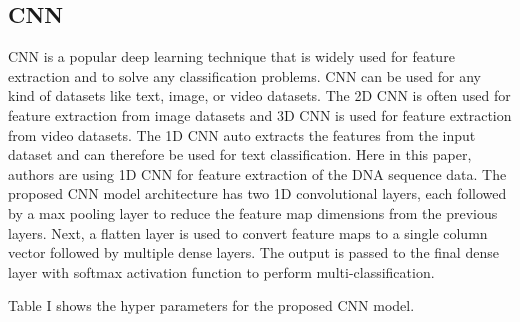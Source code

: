 \documentclass[journal]{IEEEtran}
\begin{document}
  \subsection{CNN}
    CNN is a popular deep learning technique that is widely used for feature extraction
    and to solve any classification problems.
    CNN can be used for any kind of datasets like text, image, or video datasets.
    The 2D CNN is often used for feature extraction from image datasets and
    3D CNN is used for feature extraction from video datasets.
    The 1D CNN auto extracts the features from the input dataset and can therefore be used
    for text classification. Here in this paper, authors are using 1D CNN for feature extraction
    of the DNA sequence data. The proposed CNN model architecture has two 1D convolutional layers,
    each followed by a max pooling layer to reduce the feature map dimensions from the previous layers.
    Next, a flatten layer is used to convert feature maps to a single column vector followed by multiple dense layers.
    The output is passed to the final dense layer with softmax activation function to perform multi-classification.

    Table I shows the hyper parameters for the proposed CNN model.
    \begin{table}
      \caption{\label{tab:table-name}Hyper parameters of CNN model}
      \centering
    \end{table}
\end{document}
